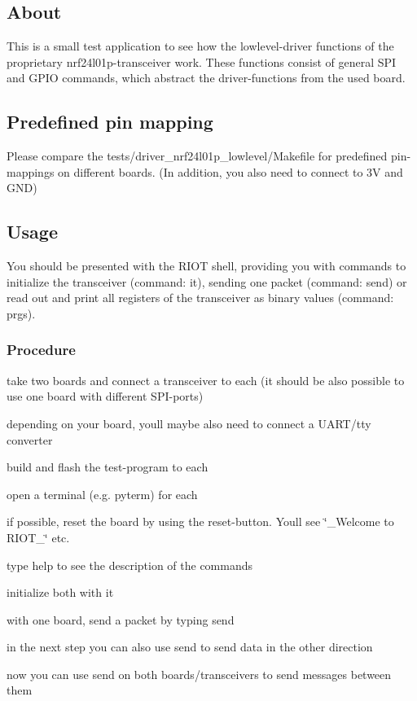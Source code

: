 \subsection*{About}

This is a small test application to see how the lowlevel-\/driver functions of the proprietary nrf24l01p-\/transceiver work. These functions consist of general S\+PI and G\+P\+IO commands, which abstract the driver-\/functions from the used board.

\subsection*{Predefined pin mapping}

Please compare the {\ttfamily tests/driver\+\_\+nrf24l01p\+\_\+lowlevel/\+Makefile} for predefined pin-\/mappings on different boards. (In addition, you also need to connect to 3V and G\+ND)

\subsection*{Usage}

You should be presented with the R\+I\+OT shell, providing you with commands to initialize the transceiver (command\+: {\ttfamily it}), sending one packet (command\+: {\ttfamily send}) or read out and print all registers of the transceiver as binary values (command\+: {\ttfamily prgs}).

\subsubsection*{Procedure}


\begin{DoxyItemize}
\item take two boards and connect a transceiver to each (it should be also possible to use one board with different S\+P\+I-\/ports)
\item depending on your board, you\textquotesingle{}ll maybe also need to connect a U\+A\+R\+T/tty converter
\item build and flash the test-\/program to each
\item open a terminal (e.\+g. pyterm) for each
\item if possible, reset the board by using the reset-\/button. You\textquotesingle{}ll see \char`\"{}\+\_\+\+Welcome to R\+I\+O\+T\+\_\+\char`\"{} etc.
\item type {\ttfamily help} to see the description of the commands
\item initialize both with {\ttfamily it}
\item with one board, send a packet by typing {\ttfamily send}
\item in the next step you can also use {\ttfamily send} to send data in the other direction
\item now you can use send on both boards/transceivers to send messages between them
\end{DoxyItemize}

